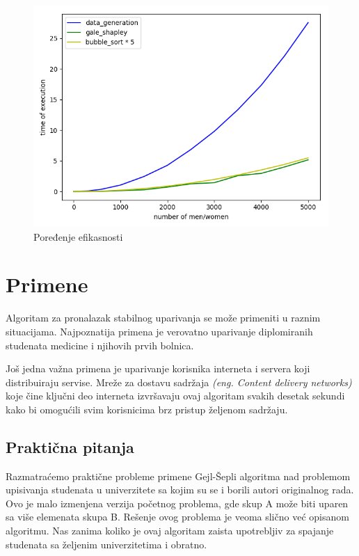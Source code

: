 \documentclass[a4paper]{article}
\begin{document}
\begin{figure}
	\centering
	\includegraphics[scale=0.5]{resources/execution_comparison.png}
	\caption{Poređenje efikasnosti}
	\label{fig1}
\end{figure}
\section{Primene}

Algoritam za pronalazak stabilnog uparivanja se može primeniti u raznim situacijama. Najpoznatija primena je verovatno uparivanje diplomiranih studenata medicine i njihovih prvih bolnica. 

Još jedna važna primena je uparivanje korisnika interneta i servera koji distribuiraju servise. Mreže za dostavu sadržaja \textit{(eng. Content delivery networks)} koje čine ključni deo interneta izvršavaju ovaj algoritam svakih desetak sekundi kako bi omogućili svim korisnicima brz pristup željenom sadržaju.

\subsection{Praktična pitanja}
Razmatraćemo praktične probleme primene Gejl-Šepli algoritma nad problemom upisivanja studenata u univerzitete sa kojim su se i borili autori originalnog rada. Ovo je malo izmenjena verzija početnog problema, gde skup A može biti uparen sa više elemenata skupa B. Rešenje ovog problema je veoma slično već opisanom algoritmu. Nas zanima koliko je ovaj algoritam zaista upotrebljiv za spajanje studenata sa željenim univerzitetima i obratno.
\end{document}
